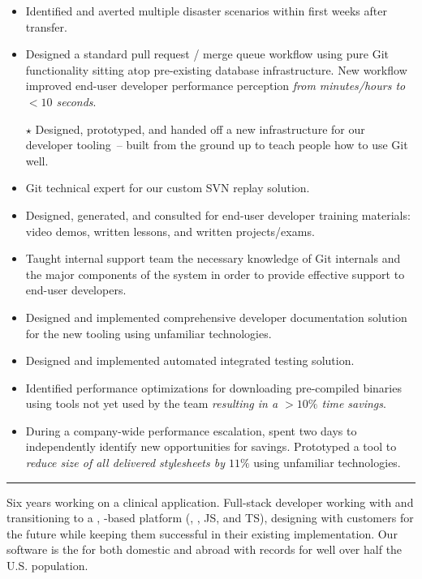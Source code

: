 \begin{position}
\begin{itemize}
  \def\importantpoint{{\large$\star$\hspace*{-1pt}}}
\item Identified and averted multiple disaster scenarios within first
  weeks after transfer.
%
%
%
\item Designed a standard pull request / merge queue workflow using
  pure Git functionality sitting atop pre-existing database
  infrastructure. New workflow improved end-user developer performance
  perception \emph{from minutes\slash hours to $<10$ seconds}.
\item[\importantpoint] Designed, prototyped, and handed off a new
  infrastructure for our developer tooling~-- built from the ground up
  to teach people how to use Git well.
\item Git technical expert for our custom SVN replay solution.
\item Designed, generated, and consulted for end-user developer
  training materials: video demos, written lessons, and written
  projects/exams.
\item Taught internal support team the necessary knowledge of Git
  internals and the major components of the system in order to provide
  effective support to end-user developers.
\item Designed and implemented comprehensive developer documentation
  solution for the new tooling using unfamiliar technologies.
\item Designed and implemented automated integrated testing solution.
\item Identified performance optimizations for downloading
  pre-compiled binaries using tools not yet used by the team
  \emph{resulting in a $>10\%$ time savings}.
\item During a company-wide performance escalation, spent two days to
  independently identify new opportunities for savings. Prototyped a
  tool to \emph{reduce size of all delivered stylesheets by $11\%$}
  using unfamiliar technologies.
\end{itemize}

\medskip
\hrule
\medskip

Six years working on a clinical application. Full-stack developer
working with  and  transitioning to a
,  -based platform
(, \CSharp, JS, and TS), designing with customers for the
future while keeping them successful in their existing implementation.
Our software is the  for  both domestic and abroad \Dash with records for well over
half the U.S. population.


\end{position}

